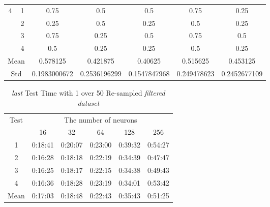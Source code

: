\documentclass[draft,dvipsnames]{drexel-thesis}
\begin{document}
\begin{thesis}
\begin{table}[!t]
\begin{tabular}{|c|c|c|c|c|c|c|}
\multirow{4}{*}{4}    & 1                   & 0.75         & 0.5          & 0.5          & 0.75        & 0.25         \\ \cline{2-7}
                      & 2                   & 0.25         & 0.5          & 0.25         & 0.5         & 0.25         \\ \cline{2-7}
                      & 3                   & 0.75         & 0.25         & 0.5          & 0.75        & 0.5          \\ \cline{2-7}
                      & 4                   & 0.5          & 0.25         & 0.25         & 0.5         & 0.25         \\ \hline
\multicolumn{2}{|c|}{Mean}                  & 0.578125     & 0.421875     & 0.40625      & 0.515625    & 0.453125     \\ \hline
\multicolumn{2}{|c|}{Std}                   & 0.1983000672 & 0.2536196299 & 0.1547847968 & 0.249478623 & 0.2452677109 \\ \hline
\end{tabular}
\end{table}

\begin{table}[!t]
\centering
\caption{{\em last} Test Time with 1 over 50 Re-sampled {\em filtered dataset}}
\label{tbl:last_1_50_time}
\begin{tabular}{|c|c|c|c|c|c|}
\hline
\multirow{2}{*}{Test}      & \multicolumn{5}{c|}{The number of neurons}                                                                                                               \\ \cline{2-6}
                           & 16                           & 32                           & 64                           & 128                          & 256                          \\ \hline
1                          & 0:18:41                      & 0:20:07                      & 0:23:00                      & 0:39:32                      & 0:54:27                      \\ \hline
2                          & 0:16:28                      & 0:18:18                      & 0:22:19                      & 0:34:39                      & 0:47:47                      \\ \hline
3                          & 0:16:25                      & 0:18:17                      & 0:22:15                      & 0:34:38                      & 0:49:43                      \\ \hline
4                          & 0:16:36                      & 0:18:28                      & 0:23:19                      & 0:34:01                      & 0:53:42                      \\ \hline
\multicolumn{1}{|l|}{Mean} & \multicolumn{1}{l|}{0:17:03} & \multicolumn{1}{l|}{0:18:48} & \multicolumn{1}{l|}{0:22:43} & \multicolumn{1}{l|}{0:35:43} & \multicolumn{1}{l|}{0:51:25} \\ \hline
\end{tabular}
\end{table}


\end{thesis}
\end{document}
